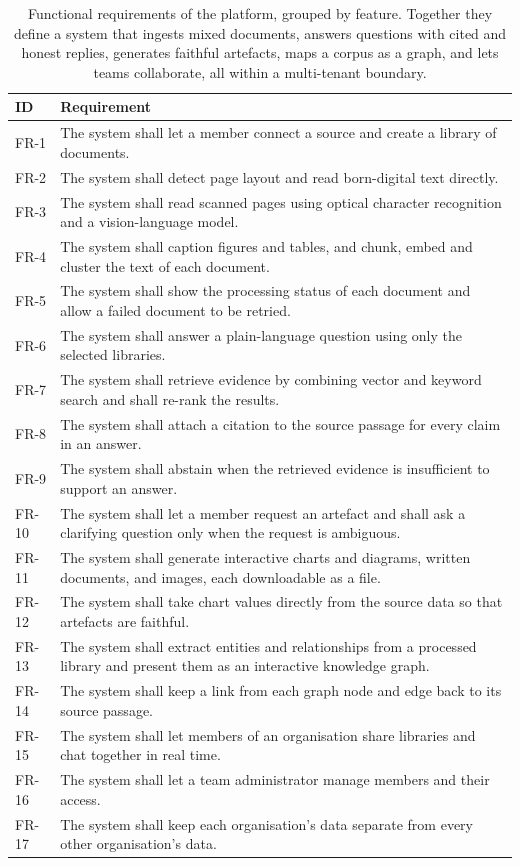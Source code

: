 \begin{table}[H]
  \centering
  \caption{Functional requirements of the platform, grouped by feature. Together
  they define a system that ingests mixed documents, answers questions with cited
  and honest replies, generates faithful artefacts, maps a corpus as a graph, and
  lets teams collaborate, all within a multi-tenant boundary.}
  \label{tab:fr}
  \small
  \begin{tabularx}{\textwidth}{@{}p{}X@{}}
    \toprule
    \textbf{ID} & \textbf{Requirement} \\
    \midrule
    FR-1  & The system shall let a member connect a source and create a library of documents. \\
    FR-2  & The system shall detect page layout and read born-digital text directly. \\
    FR-3  & The system shall read scanned pages using optical character recognition and a vision-language model. \\
    FR-4  & The system shall caption figures and tables, and chunk, embed and cluster the text of each document. \\
    FR-5  & The system shall show the processing status of each document and allow a failed document to be retried. \\
    FR-6  & The system shall answer a plain-language question using only the selected libraries. \\
    FR-7  & The system shall retrieve evidence by combining vector and keyword search and shall re-rank the results. \\
    FR-8  & The system shall attach a citation to the source passage for every claim in an answer. \\
    FR-9  & The system shall abstain when the retrieved evidence is insufficient to support an answer. \\
    FR-10 & The system shall let a member request an artefact and shall ask a clarifying question only when the request is ambiguous. \\
    FR-11 & The system shall generate interactive charts and diagrams, written documents, and images, each downloadable as a file. \\
    FR-12 & The system shall take chart values directly from the source data so that artefacts are faithful. \\
    FR-13 & The system shall extract entities and relationships from a processed library and present them as an interactive knowledge graph. \\
    FR-14 & The system shall keep a link from each graph node and edge back to its source passage. \\
    FR-15 & The system shall let members of an organisation share libraries and chat together in real time. \\
    FR-16 & The system shall let a team administrator manage members and their access. \\
    FR-17 & The system shall keep each organisation's data separate from every other organisation's data. \\
  \end{tabularx}
\end{table}

